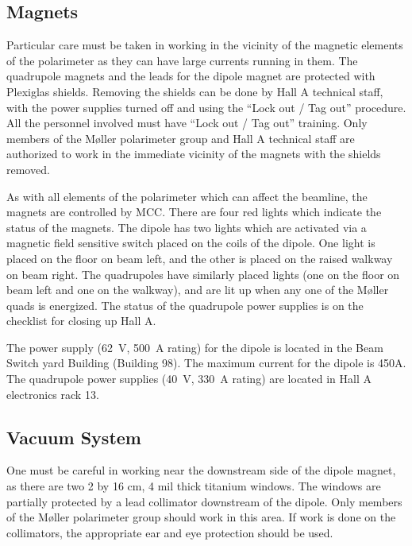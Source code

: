 \begin{safetyen}{50}{50}
\subsection{Magnets}

Particular care must be taken in working in the vicinity of the
magnetic elements of the polarimeter as they can have large currents
running in them. The quadrupole magnets and the leads for the dipole magnet 
are protected with Plexiglas shields. Removing the shields
can be done by Hall A technical staff, with the power supplies
turned off and using the ``Lock out / Tag out'' procedure. All the personnel involved
must have ``Lock out / Tag out'' training.
Only members of the M{\o}ller polarimeter group and Hall A technical staff are
authorized to work in the immediate vicinity of the magnets with the shields
removed.

As with all elements of the
polarimeter which can
affect the beamline, the magnets are controlled by MCC. There are four
red lights which indicate the status of the magnets. The dipole has two
lights which are activated via a magnetic field sensitive switch placed
on the coils of the dipole. One light is placed on the floor on beam left,
and the other is placed on the raised walkway on beam right. The quadrupoles
have similarly placed lights (one on the floor on beam left and one
on the walkway), and are lit up when any one of the M{\o}ller quads is 
energized. The status of the quadrupole power supplies is on the 
checklist for
closing up Hall A. 

The power supply (62~V, 500~A rating) for
the dipole is located in the Beam Switch yard Building (Building 98). 
The maximum current for the dipole is 450A. The
quadrupole power supplies (40~V, 330~A rating) are located in Hall A electronics rack 13.

\subsection{Vacuum System}

One must be careful in working near the downstream side of the dipole
magnet, as there are two 2 by 16 cm, 4 mil thick titanium windows.
The windows are partially protected by a lead collimator downstream
of the dipole. 
Only members of the M{\o}ller polarimeter group should work in this
area. 
If work is done on the collimators, the appropriate ear
and eye protection should be used.


\end{safetyen}
